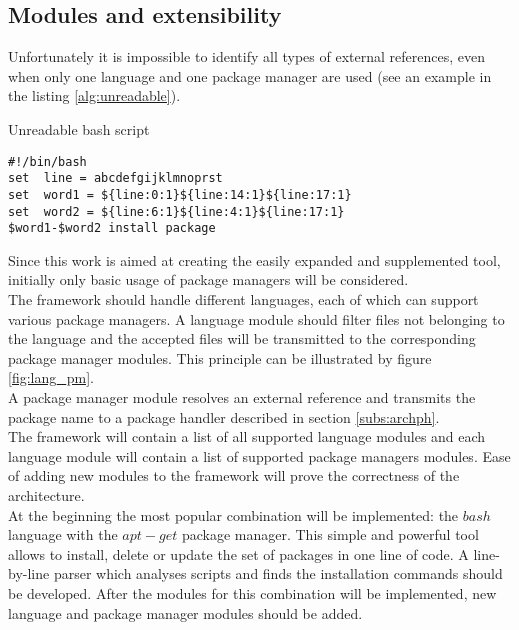 \subsection{Modules and extensibility}
Unfortunately it is impossible to identify all types of external references, even when only one language and one package manager are used (see an example in the listing \ref{alg:unreadable}).
\begin{Listing} 
	\caption{Unreadable bash script}
	\label{alg:unreadable}
\begin{lstlisting}
#!/bin/bash
set  line = abcdefgijklmnoprst
set  word1 = ${line:0:1}${line:14:1}${line:17:1} 
set  word2 = ${line:6:1}${line:4:1}${line:17:1}
$word1-$word2 install package
\end{lstlisting}
\end{Listing}
Since this work is aimed at creating the easily expanded and supplemented tool, initially only basic usage of package managers will be considered.\\
The framework should handle different languages, each of which can support various package managers.
A language module should filter files not belonging to the language and the accepted files will be transmitted to the corresponding package manager modules.
This principle can be illustrated by figure \ref{fig:lang_pm}.\\
A package manager module resolves an external reference and transmits the package name to a package handler described in section \ref{subs:archph}.\\
The framework will contain a list of all supported language modules and each language module will contain a list of supported package managers modules.
Ease of adding new modules to the framework will prove the correctness of the architecture.\\
At the beginning the most popular combination will be implemented: the $bash$ language with the $apt-get$ package manager.
This simple and powerful tool allows to install, delete or update the set of packages in one line of code.
A line-by-line parser which analyses scripts and finds the installation commands should be developed.
After the modules for this combination will be implemented, new language and package manager modules should be added.


